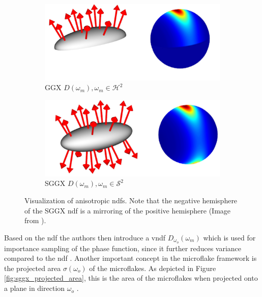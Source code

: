 \begin{figure}[ht]
    \centering
    \begin{subfigure}[b]{0.45\linewidth}
        \centering
        \includegraphics[width=\linewidth]{img/sggx_ndf_a.jpg}
        \caption{GGX $D(\omega_m), \omega_m \in \mathcal{H}^2$}
        \label{fig:sggx_ndf_a}
    \end{subfigure}
    \begin{subfigure}[b]{0.45\linewidth}
        \centering
        \includegraphics[width=1\linewidth]{img/sggx_ndf_b.jpg}
        \caption{SGGX $D(\omega_m), \omega_m \in \mathcal{S}^2$}
        \label{fig:sggx_ndf_b}
    \end{subfigure}
	\caption[Visualization of anisotropic \acsp{ndf}]{Visualization of anisotropic \acsp{ndf}. Note that the negative hemisphere of the SGGX \acs{ndf} is a mirroring of the positive hemisphere (Image from \cite{sggx}).}
	\label{fig:sggx_ndf}
\end{figure}
Based on the \acs{ndf} the authors then introduce a \ac{vndf} $D_{\omega_o}(\omega_m)$ which is used for importance sampling of the phase function, since it further reduces variance compared to the \acs{ndf} \cite{vndf_importance_sampling}.
Another important concept in the microflake framework is the projected area $\sigma(\omega_o)$ of the microflakes.
As depicted in Figure \ref{fig:sggx_projected_area}, this is the area of the microflakes when projected onto a plane in direction $\omega_o$ \cite{sggx}.
